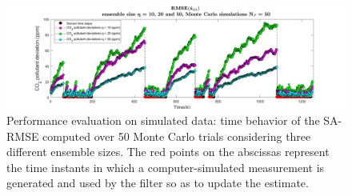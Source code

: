 \documentclass[journal]{IEEEtran}
\begin{document}
\begin{figure}[tbp] 
\hspace*{-1cm} 
	\centering
	\includegraphics[width=1.2\columnwidth]{figure/monte_tot_ensemble_2.jpg}
	\caption{Performance evaluation on simulated data: time behavior of the SA-RMSE computed over 50 Monte Carlo trials considering three different ensemble sizes. 
	The red points on the abscissas represent the time instants in which a computer-simulated measurement is generated and used by the filter so as to update the estimate.}
		\label{fig:monte_tot_time}
\end{figure}
\end{document}
